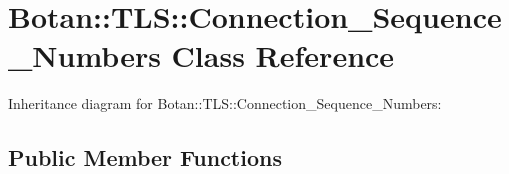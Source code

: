 \hypertarget{class_botan_1_1_t_l_s_1_1_connection___sequence___numbers}{}\section{Botan\+:\+:T\+LS\+:\+:Connection\+\_\+\+Sequence\+\_\+\+Numbers Class Reference}
\label{class_botan_1_1_t_l_s_1_1_connection___sequence___numbers}


Inheritance diagram for Botan\+:\+:T\+LS\+:\+:Connection\+\_\+\+Sequence\+\_\+\+Numbers\+:
\subsection*{Public Member Functions}
